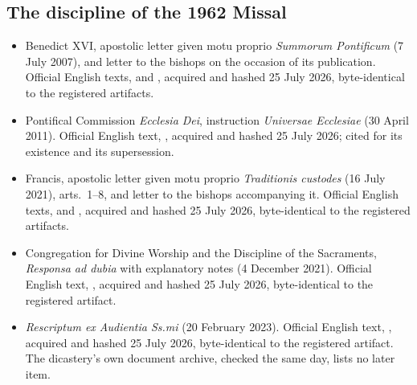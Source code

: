 \subsection*{The discipline of the 1962 Missal}

{\fontsize{8.6}{9.6}\selectfont
\begin{itemize}[itemsep=0pt,parsep=0pt,topsep=0.05em]
\item Benedict XVI, apostolic letter given motu proprio \emph{Summorum Pontificum} (7 July 2007), and letter to the bishops on the occasion of its publication. Official English texts,  and , acquired and hashed 25 July 2026, byte-identical to the registered artifacts.
\item Pontifical Commission \emph{Ecclesia Dei}, instruction \emph{Universae Ecclesiae} (30 April 2011). Official English text, , acquired and hashed 25 July 2026; cited for its existence and its supersession.
\item Francis, apostolic letter given motu proprio \emph{Traditionis custodes} (16 July 2021), arts.~1--8, and letter to the bishops accompanying it. Official English texts,  and , acquired and hashed 25 July 2026, byte-identical to the registered artifacts.
\item Congregation for Divine Worship and the Discipline of the Sacraments, \emph{Responsa ad dubia} with explanatory notes (4 December 2021). Official English text, , acquired and hashed 25 July 2026, byte-identical to the registered artifact.
\item \emph{Rescriptum ex Audientia Ss.mi} (20 February 2023). Official English text, , acquired and hashed 25 July 2026, byte-identical to the registered artifact. The dicastery's own document archive, checked the same day, lists no later item.
\end{itemize}}

